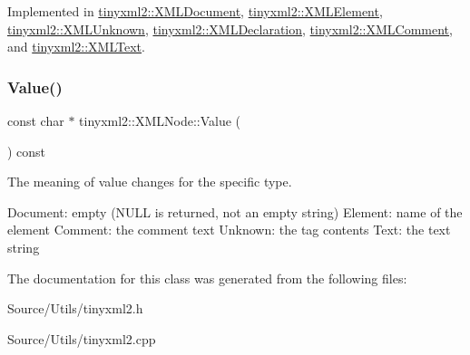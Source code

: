 Implemented in \mbox{\hyperlink{classtinyxml2_1_1_x_m_l_document_a6fe5ef18699091844fcf64b56ffa5bf9}{tinyxml2\+::\+X\+M\+L\+Document}}, \mbox{\hyperlink{classtinyxml2_1_1_x_m_l_element_a61ffd7bf918a9db4aa6203d855ac5ec2}{tinyxml2\+::\+X\+M\+L\+Element}}, \mbox{\hyperlink{classtinyxml2_1_1_x_m_l_unknown_ac46767cd721d666e690a6231dfb618d1}{tinyxml2\+::\+X\+M\+L\+Unknown}}, \mbox{\hyperlink{classtinyxml2_1_1_x_m_l_declaration_ae8b4d3a399857029f36c322b0801b69c}{tinyxml2\+::\+X\+M\+L\+Declaration}}, \mbox{\hyperlink{classtinyxml2_1_1_x_m_l_comment_a965d880a99d58dd915caa88dc37a9b51}{tinyxml2\+::\+X\+M\+L\+Comment}}, and \mbox{\hyperlink{classtinyxml2_1_1_x_m_l_text_a99d8bce4dc01df889126e047f358cdfc}{tinyxml2\+::\+X\+M\+L\+Text}}.

\mbox{\label{classtinyxml2_1_1_x_m_l_node_a0485e51c670e741884cfd8362274d680}} 
\subsubsection{\texorpdfstring{Value()}{Value()}}
{\footnotesize\ttfamily const char $\ast$ tinyxml2\+::\+X\+M\+L\+Node\+::\+Value (\begin{DoxyParamCaption}{ }\end{DoxyParamCaption}) const}

The meaning of \textquotesingle{}value\textquotesingle{} changes for the specific type. \begin{DoxyVerb}Document:   empty (NULL is returned, not an empty string)
Element:    name of the element
Comment:    the comment text
Unknown:    the tag contents
Text:       the text string
\end{DoxyVerb}
 

The documentation for this class was generated from the following files\+:\begin{DoxyCompactItemize}
\item 
Source/\+Utils/tinyxml2.\+h\item 
Source/\+Utils/tinyxml2.\+cpp\end{DoxyCompactItemize}
